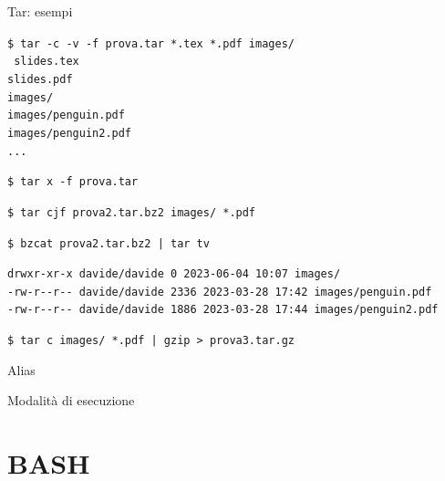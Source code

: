 \documentclass{beamer}
\begin{document}
    \begin{frame}{Tar: esempi}
        \scriptsize
        \begin{exampleblock}{}
            \texttt{\$ tar -c -v -f prova.tar *.tex *.pdf images/} \\
            \texttt{
            slides.tex \\
                slides.pdf \\
                images/ \\
                images/penguin.pdf \\
                images/penguin2.pdf \\
                ...
            }

            \vspace{0.25cm}

            \texttt{\$ tar x -f prova.tar}

            \texttt{\$ tar cjf prova2.tar.bz2 images/ *.pdf}
            
            \vspace{0.25cm}

            \texttt{\$ bzcat prova2.tar.bz2 | tar tv}

            \texttt{drwxr-xr-x davide/davide     0 2023-06-04 10:07 images/ \\
            -rw-r-{}-r-{}- davide/davide  2336 2023-03-28 17:42 images/penguin.pdf \\
            -rw-r-{}-r-{}- davide/davide  1886 2023-03-28 17:44 images/penguin2.pdf
            }

            \vspace{0.25cm}

            \texttt{\$ tar c images/ *.pdf | gzip > prova3.tar.gz}
        \end{exampleblock}
    \end{frame}

    \begin{frame}{Alias}
    \end{frame}

    \begin{frame}{Modalità di esecuzione}
    \end{frame}

    \section{BASH}


    
\end{document}
